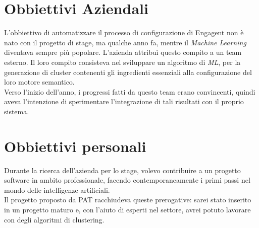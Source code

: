 \section{Obbiettivi Aziendali}
L'obbiettivo di automatizzare il processo di configurazione di Engagent non è nato con il progetto di stage, ma qualche anno fa, mentre il \textit{Machine Learning} diventava sempre più popolare. L'azienda attribuì questo compito a un team esterno. Il loro compito consisteva nel sviluppare un algoritmo di \textit{ML}, per la generazione di cluster contenenti gli ingredienti essenziali alla configurazione del loro motore semantico.\\
Verso l'inizio dell'anno, i progressi fatti da questo team erano convincenti, quindi \company aveva l'intenzione di sperimentare l'integrazione di tali risultati con il proprio sistema.

\section{Obbiettivi personali}

Durante la ricerca dell'azienda per lo stage, volevo contribuire a un progetto software in ambito professionale, facendo contemporaneamente i primi passi nel mondo delle intelligenze artificiali.\\
Il progetto proposto da PAT racchiudeva queste prerogative: sarei stato inserito in un progetto maturo e, con l'aiuto di esperti nel settore, avrei potuto lavorare con degli algoritmi di clustering.   

